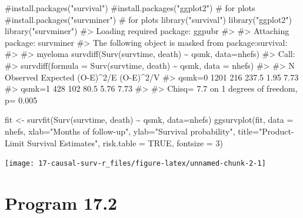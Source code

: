 \documentclass[
  10pt,
  a4paper,
]{book}
\newenvironment{Shaded}{\begin{snugshade}}{\end{snugshade}}
\newcommand{\AttributeTok}[1]{\textcolor[rgb]{0.40,0.45,0.13}{#1}}
\newcommand{\CommentTok}[1]{\textcolor[rgb]{0.37,0.37,0.37}{#1}}
\newcommand{\ConstantTok}[1]{\textcolor[rgb]{0.56,0.35,0.01}{#1}}
\newcommand{\DecValTok}[1]{\textcolor[rgb]{0.68,0.00,0.00}{#1}}
\newcommand{\FunctionTok}[1]{\textcolor[rgb]{0.28,0.35,0.67}{#1}}
\newcommand{\NormalTok}[1]{\textcolor[rgb]{0.00,0.46,0.62}{#1}}
\newcommand{\OtherTok}[1]{\textcolor[rgb]{0.00,0.46,0.62}{#1}}
\newcommand{\SpecialCharTok}[1]{\textcolor[rgb]{0.37,0.37,0.37}{#1}}
\newcommand{\StringTok}[1]{\textcolor[rgb]{0.13,0.47,0.30}{#1}}
\begin{document}
\begin{Shaded}
\begin{Highlighting}[]
\CommentTok{\#install.packages("survival")}
\CommentTok{\#install.packages("ggplot2") \# for plots}
\CommentTok{\#install.packages("survminer") \# for plots}
\FunctionTok{library}\NormalTok{(}\StringTok{"survival"}\NormalTok{)}
\FunctionTok{library}\NormalTok{(}\StringTok{"ggplot2"}\NormalTok{)}
\FunctionTok{library}\NormalTok{(}\StringTok{"survminer"}\NormalTok{)}
\CommentTok{\#\textgreater{} Loading required package: ggpubr}
\CommentTok{\#\textgreater{} }
\CommentTok{\#\textgreater{} Attaching package: \textquotesingle{}survminer\textquotesingle{}}
\CommentTok{\#\textgreater{} The following object is masked from \textquotesingle{}package:survival\textquotesingle{}:}
\CommentTok{\#\textgreater{} }
\CommentTok{\#\textgreater{}     myeloma}
\FunctionTok{survdiff}\NormalTok{(}\FunctionTok{Surv}\NormalTok{(survtime, death) }\SpecialCharTok{\textasciitilde{}}\NormalTok{ qsmk, }\AttributeTok{data=}\NormalTok{nhefs)}
\CommentTok{\#\textgreater{} Call:}
\CommentTok{\#\textgreater{} survdiff(formula = Surv(survtime, death) \textasciitilde{} qsmk, data = nhefs)}
\CommentTok{\#\textgreater{} }
\CommentTok{\#\textgreater{}           N Observed Expected (O{-}E)\^{}2/E (O{-}E)\^{}2/V}
\CommentTok{\#\textgreater{} qsmk=0 1201      216    237.5      1.95      7.73}
\CommentTok{\#\textgreater{} qsmk=1  428      102     80.5      5.76      7.73}
\CommentTok{\#\textgreater{} }
\CommentTok{\#\textgreater{}  Chisq= 7.7  on 1 degrees of freedom, p= 0.005}

\NormalTok{fit }\OtherTok{\textless{}{-}} \FunctionTok{survfit}\NormalTok{(}\FunctionTok{Surv}\NormalTok{(survtime, death) }\SpecialCharTok{\textasciitilde{}}\NormalTok{ qsmk, }\AttributeTok{data=}\NormalTok{nhefs)}
\FunctionTok{ggsurvplot}\NormalTok{(fit, }\AttributeTok{data =}\NormalTok{ nhefs, }\AttributeTok{xlab=}\StringTok{"Months of follow{-}up"}\NormalTok{,}
           \AttributeTok{ylab=}\StringTok{"Survival probability"}\NormalTok{,}
           \AttributeTok{title=}\StringTok{"Product{-}Limit Survival Estimates"}\NormalTok{, }\AttributeTok{risk.table =} \ConstantTok{TRUE}\NormalTok{,}
           \AttributeTok{fontsize =} \DecValTok{3}\NormalTok{)}
\end{Highlighting}
\end{Shaded}

\begin{center}\texttt{[image: 17-causal-surv-r\_files/figure-latex/unnamed-chunk-2-1]} \end{center}

\section{Program 17.2}\label{program-17.2}
\end{document}
